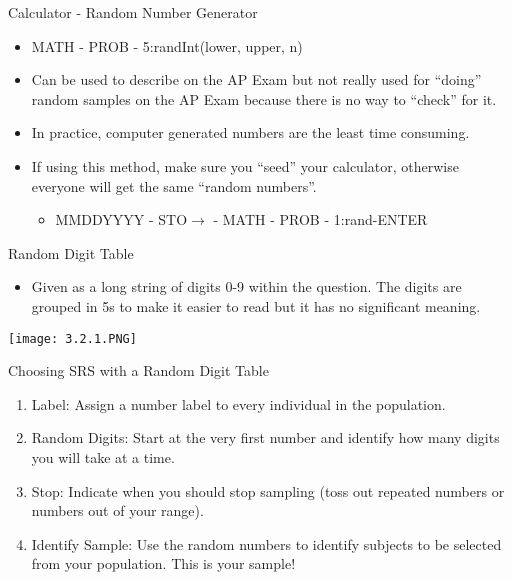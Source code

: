 \documentclass[../stats.tex]{subfiles}
\begin{document}
Calculator - Random Number Generator 
\begin{itemize}
    \item MATH - PROB - 5:randInt(lower, upper, n)
    \item Can be used to describe on the AP Exam but not really used for ``doing'' random samples on the AP Exam because there is no way to ``check'' for it.
    \item In practice, computer generated numbers are the least time consuming.
    \item If using this method, make sure you ``seed'' your calculator, otherwise everyone will get the same ``random numbers''.
    \begin{itemize}
        \item MMDDYYYY - STO$\rightarrow$ - MATH - PROB - 1:rand-ENTER
    \end{itemize}
\end{itemize}

Random Digit Table 
\begin{itemize}
    \item Given as a long string of digits 0-9 within the question. The digits are grouped in 5s to make it easier to read but it has no significant meaning.
\end{itemize}
\begin{center}
    \texttt{[image: 3.2.1.PNG]}
\end{center}

Choosing SRS with a Random Digit Table 
\begin{enumerate}
    \item Label: Assign a number label to every individual in the population.
    \item Random Digits: Start at the very first number and identify how many digits you will take at a time.
    \item Stop: Indicate when you should stop sampling (toss out repeated numbers or numbers out of your range).
    \item Identify Sample: Use the random numbers to identify subjects to be selected from your population. This is your sample!
\end{enumerate}
\end{document}
